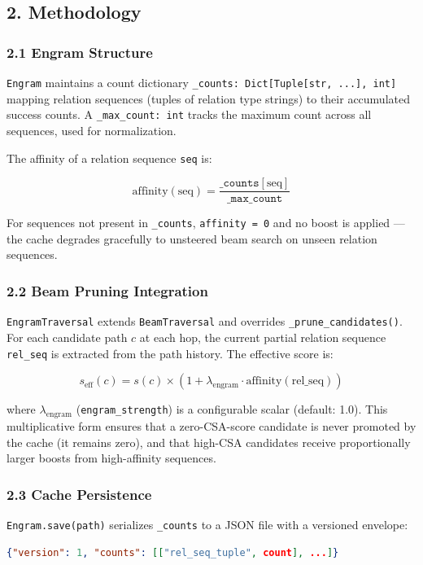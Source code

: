 \subsection*{2. Methodology}

\subsubsection*{2.1 Engram Structure}
\texttt{Engram} maintains a count dictionary \texttt{\_counts: Dict[Tuple[str, ...], int]} mapping relation sequences (tuples of relation type strings) to their accumulated success counts. A \texttt{\_max\_count: int} tracks the maximum count across all sequences, used for normalization.

The affinity of a relation sequence \texttt{seq} is:

$$\text{affinity}(\text{seq}) = \frac{\texttt{\_counts}[\text{seq}]}{\texttt{\_max\_count}}$$

For sequences not present in \texttt{\_counts}, \texttt{affinity = 0} and no boost is applied --- the cache degrades gracefully to unsteered beam search on unseen relation sequences.

\subsubsection*{2.2 Beam Pruning Integration}
\texttt{EngramTraversal} extends \texttt{BeamTraversal} and overrides \texttt{\_prune\_candidates()}. For each candidate path $c$ at each hop, the current partial relation sequence \texttt{rel\_seq} is extracted from the path history. The effective score is:

$$s_\text{eff}(c) = s(c) \times (1 + \lambda_\text{engram} \cdot \text{affinity}(\text{rel\_seq}))$$

where $\lambda_\text{engram}$ (\texttt{engram\_strength}) is a configurable scalar (default: 1.0). This multiplicative form ensures that a zero-CSA-score candidate is never promoted by the cache (it remains zero), and that high-CSA candidates receive proportionally larger boosts from high-affinity sequences.

\subsubsection*{2.3 Cache Persistence}
\texttt{Engram.save(path)} serializes \texttt{\_counts} to a JSON file with a versioned envelope:

\begin{lstlisting}[language=Json]
{"version": 1, "counts": [["rel_seq_tuple", count], ...]}
\end{lstlisting}


